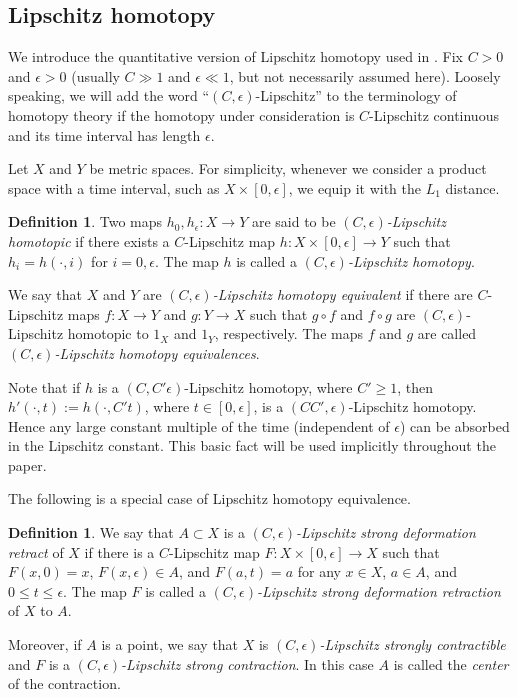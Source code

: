 \documentclass[a4paper,12pt]{amsart}
\theoremstyle{plain}
\theoremstyle{definition}
\newtheorem{dfn}[thm]{Definition}
\numberwithin{thm}{section}
\numberwithin{equation}{section}
\begin{document}
\subsection{Lipschitz homotopy}

We introduce the quantitative version of Lipschitz homotopy used in \cite{MY:lip}.
Fix $C>0$ and $\epsilon>0$ (usually $C\gg1$ and $\epsilon\ll1$, but not necessarily assumed here).
Loosely speaking, we will add the word ``$(C,\epsilon)$-Lipschitz'' to the terminology of homotopy theory if the homotopy under consideration is $C$-Lipschitz continuous and its time interval has length $\epsilon$.

Let $X$ and $Y$ be metric spaces.
For simplicity, whenever we consider a product space with a time interval, such as $X\times[0,\epsilon]$, we equip it with the $L_1$ distance.

\begin{dfn}
Two maps $h_0, h_\epsilon:X\to Y$ are said to be \textit{$(C,\epsilon)$-Lipschitz homotopic} if there exists a $C$-Lipschitz map $h:X\times[0,\epsilon]\to Y$ such that $h_i = h(\cdot,i)$ for $i=0,\epsilon$.
The map $h$ is called a \textit{$(C,\epsilon)$-Lipschitz homotopy}.

We say that $X$ and $Y$ are \textit{$(C,\epsilon)$-Lipschitz homotopy equivalent} if there are $C$-Lipschitz maps $f:X\to Y$ and $g:Y\to X$ such that $g\circ f$ and $f\circ g$ are $(C,\epsilon)$-Lipschitz homotopic to $1_X$ and $1_Y$, respectively.
The maps $f$ and $g$ are called \textit{$(C,\epsilon)$-Lipschitz homotopy equivalences}.
\end{dfn}

Note that if $h$ is a $(C,C'\epsilon)$-Lipschitz homotopy, where $C'\ge 1$, then $h'(\cdot,t):=h(\cdot,C't)$, where $t\in[0,\epsilon]$, is a $(CC',\epsilon)$-Lipschitz homotopy.
Hence any large constant multiple of the time (independent of $\epsilon$) can be absorbed in the Lipschitz constant.
This basic fact will be used  implicitly throughout the paper.

The following is a special case of Lipschitz homotopy equivalence.

\begin{dfn}
We say that $A\subset X$ is a \textit{$(C,\epsilon)$-Lipschitz strong deformation retract} of $X$ if there is a $C$-Lipschitz map $F:X\times[0,\epsilon]\to X$ such that $F(x,0)=x$, $F(x,\epsilon)\in A$, and $F(a,t)=a$ for any $x \in X$, $a \in A$, and $0\le t\le \epsilon$. 
The map $F$ is called a \textit{$(C,\epsilon)$-Lipschitz strong deformation retraction} of $X$ to $A$.

Moreover, if $A$ is a point, we say that $X$ is \textit{$(C,\epsilon)$-Lipschitz strongly contractible} and $F$ is a \textit{$(C,\epsilon)$-Lipschitz strong contraction}.
In this case $A$ is called the \textit{center} of the contraction.
\end{dfn}
\end{document}
